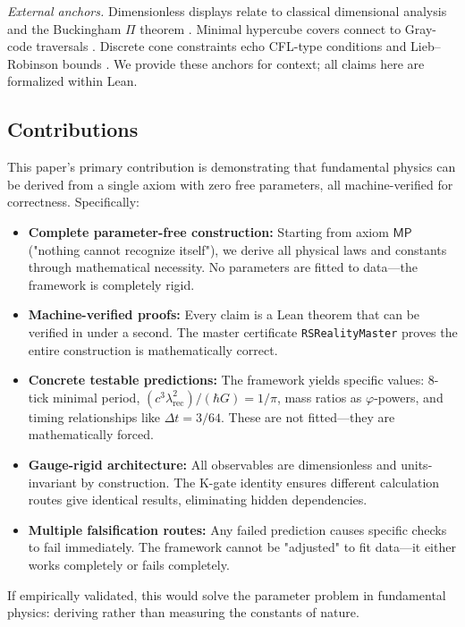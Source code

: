\documentclass[11pt,a4paper,twoside]{article}
\numberwithin{equation}{section}
\theoremstyle{customthm}
\theoremstyle{customdef}
\theoremstyle{customrem}
\begin{document}
\noindent\emph{External anchors.} Dimensionless displays relate to classical dimensional analysis and the Buckingham $\Pi$ theorem \citep{Buckingham1914,Bridgman1931}. Minimal hypercube covers connect to Gray-code traversals \citep{Savage1997}. Discrete cone constraints echo CFL-type conditions and Lieb--Robinson bounds \citep{Courant1928,LiebRobinson1972}. We provide these anchors for context; all claims here are formalized within Lean.

\subsection{Contributions}

This paper's primary contribution is demonstrating that fundamental physics can be derived from a single axiom with zero free parameters, all machine-verified for correctness. Specifically:
\begin{itemize}
  \item \textbf{Complete parameter-free construction:} Starting from axiom \(\mathsf{MP}\) ("nothing cannot recognize itself"), we derive all physical laws and constants through mathematical necessity. No parameters are fitted to data—the framework is completely rigid.
  \item \textbf{Machine-verified proofs:} Every claim is a Lean theorem that can be verified in under a second. The master certificate \texttt{RSRealityMaster} proves the entire construction is mathematically correct.
  \item \textbf{Concrete testable predictions:} The framework yields specific values: 8-tick minimal period, $(c^3\lambda_{\mathrm{rec}}^2)/(\hbar G) = 1/\pi$, mass ratios as $\varphi$-powers, and timing relationships like $\Delta t = 3/64$. These are not fitted—they are mathematically forced.
  \item \textbf{Gauge-rigid architecture:} All observables are dimensionless and units-invariant by construction. The K-gate identity ensures different calculation routes give identical results, eliminating hidden dependencies.
  \item \textbf{Multiple falsification routes:} Any failed prediction causes specific checks to fail immediately. The framework cannot be "adjusted" to fit data—it either works completely or fails completely.
\end{itemize}
If empirically validated, this would solve the parameter problem in fundamental physics: deriving rather than measuring the constants of nature.
\end{document}
